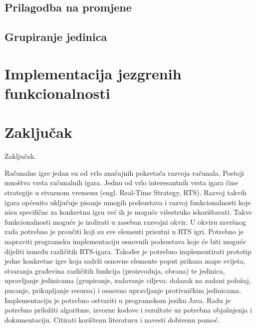 \documentclass[times, utf8, zavrsni, numeric]{fer}
\begin{document}
\section{Prilagodba na promjene}

\section{Grupiranje jedinica}

\chapter{Implementacija jezgrenih funkcionalnosti}\label{ch:implementation}

\chapter{Zaključak}\label{ch:conclusion}
Zaključak.




\begin{sazetak}
Računalne igre jedan su od vrlo značajnih pokretača razvoja računala. Postoji mnoštvo vrsta računalnih igara. 
Jednu od vrlo interesantnih vrsta igara čine strategije u stvarnom vremenu (engl. Real-Time Strategy, RTS). 
Razvoj takvih igara općenito uključuje pisanje mnogih podsustava i razvoj funkcionalnosti koje nisu specifične za konkretnu igru već ih je moguće višestruko iskorištavati. 
Takve funkcionalnosti moguće je izolirati u zaseban razvojni okvir. U okviru završnog rada potrebno je proučiti koji su sve elementi prisutni u RTS igri. 
Potrebno je napraviti programsku implementaciju osnovnih podsustava koje će biti moguće dijeliti između različitih RTS-igara. 
Također je potrebno implementirati prototip jedne konkretne igre koja sadrži osnovne elemente poput prikaza mape svijeta, stvaranja građevina različitih funkcija (proizvodnja, obrana) te jedinica, upravljanje jedinicama (grupiranje, zadavanje ciljeva: dolazak na zadani položaj, pucanje, prikupljanje resursa) i osnovno upravljanje protivničkim jedinicama. 
Implementaciju je potrebno ostvariti u programskom jeziku Java. 
Radu je potrebno priložiti algoritme, izvorne kodove i rezultate uz potrebna objašnjenja i dokumentaciju. 
Citirati korištenu literaturu i navesti dobivenu pomoć.

\end{sazetak}
\end{document}

